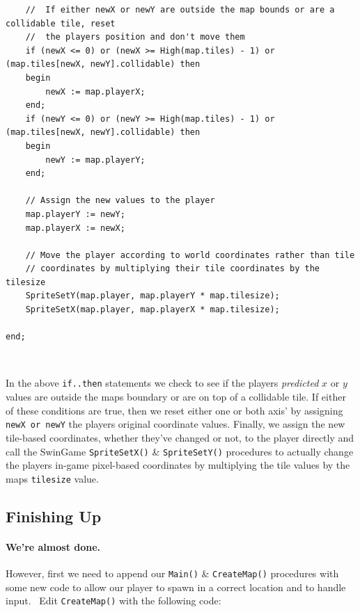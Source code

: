 \documentclass{article}
\begin{document}
 \begin{mdframed}[backgroundcolor=darkgray]
 \begin{verbatim}
	//	If either newX or newY are outside the map bounds or are a collidable tile, reset
	//	the players position and don't move them
	if (newX <= 0) or (newX >= High(map.tiles) - 1) or (map.tiles[newX, newY].collidable) then
	begin
		newX := map.playerX;
	end;
	if (newY <= 0) or (newY >= High(map.tiles) - 1) or (map.tiles[newX, newY].collidable) then
	begin
		newY := map.playerY;
	end;

	// Assign the new values to the player
	map.playerY := newY;
	map.playerX := newX;

	// Move the player according to world coordinates rather than tile
	// coordinates by multiplying their tile coordinates by the tilesize
	SpriteSetY(map.player, map.playerY * map.tilesize);
	SpriteSetX(map.player, map.playerX * map.tilesize);

end;
 \end{verbatim}
 \end{mdframed}

\

In the above \texttt{if..then} statements we check to see if the players \emph{predicted} $x$ or $y$ values are outside the maps boundary or are on top of a collidable tile. If either of these conditions are true, then we reset either one or both axis' by assigning \texttt{newX or newY} the players original coordinate values. Finally, we assign the new tile-based coordinates, whether they've changed or not, to the player directly and call the SwinGame \texttt{SpriteSetX()} \& \texttt{SpriteSetY()} procedures to actually change the players in-game pixel-based coordinates by multiplying the tile values by the maps \texttt{tilesize} value.

\clearpage

\subsection{Finishing Up}

\paragraph{We're almost done.} However, first we need to append our \texttt{Main()} \& \texttt{CreateMap()} procedures with some new code to allow our player to spawn in a correct location and to handle input.
\
Edit \texttt{CreateMap()} with the following code:
\
\vspace{0.5cm}
\end{document}
